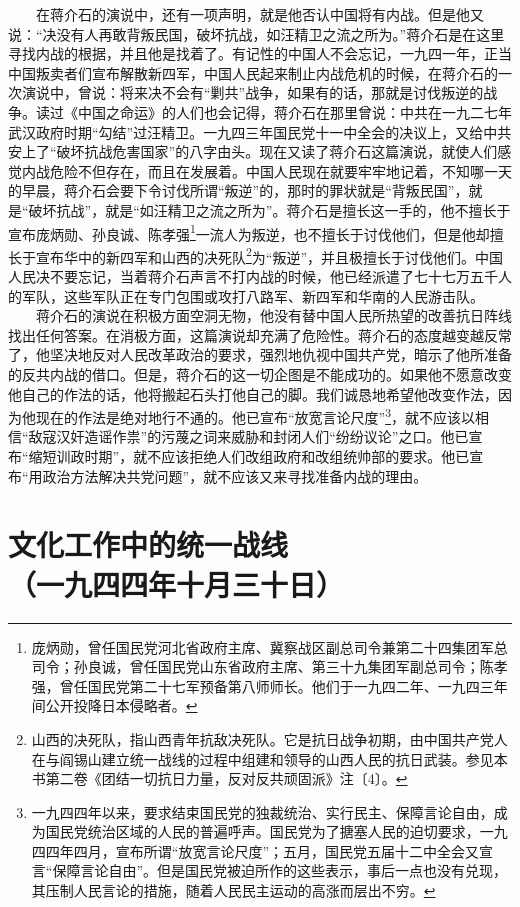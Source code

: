 \documentclass[cn,11pt,chinese]{elegantbook}
\def\myformat#1{\hfil\hfil #1}
\begin{document}
　　在蒋介石的演说中，还有一项声明，就是他否认中国将有内战。但是他又说：“决没有人再敢背叛民国，破坏抗战，如汪精卫之流之所为。”蒋介石是在这里寻找内战的根据，并且他是找着了。有记性的中国人不会忘记，一九四一年，正当中国叛卖者们宣布解散新四军，中国人民起来制止内战危机的时候，在蒋介石的一次演说中，曾说：将来决不会有“剿共”战争，如果有的话，那就是讨伐叛逆的战争。读过《中国之命运》的人们也会记得，蒋介石在那里曾说：中共在一九二七年武汉政府时期“勾结”过汪精卫。一九四三年国民党十一中全会的决议上，又给中共安上了“破坏抗战危害国家”的八字由头。现在又读了蒋介石这篇演说，就使人们感觉内战危险不但存在，而且在发展着。中国人民现在就要牢牢地记着，不知哪一天的早晨，蒋介石会要下令讨伐所谓“叛逆”的，那时的罪状就是“背叛民国”，就是“破坏抗战”，就是“如汪精卫之流之所为”。蒋介石是擅长这一手的，他不擅长于宣布庞炳勋、孙良诚、陈孝强\footnote[1]{ 庞炳勋，曾任国民党河北省政府主席、冀察战区副总司令兼第二十四集团军总司令；孙良诚，曾任国民党山东省政府主席、第三十九集团军副总司令；陈孝强，曾任国民党第二十七军预备第八师师长。他们于一九四二年、一九四三年间公开投降日本侵略者。}一流人为叛逆，也不擅长于讨伐他们，但是他却擅长于宣布华中的新四军和山西的决死队\footnote[2]{ 山西的决死队，指山西青年抗敌决死队。它是抗日战争初期，由中国共产党人在与阎锡山建立统一战线的过程中组建和领导的山西人民的抗日武装。参见本书第二卷《团结一切抗日力量，反对反共顽固派》注〔4〕。}为“叛逆”，并且极擅长于讨伐他们。中国人民决不要忘记，当着蒋介石声言不打内战的时候，他已经派遣了七十七万五千人的军队，这些军队正在专门包围或攻打八路军、新四军和华南的人民游击队。\\
　　蒋介石的演说在积极方面空洞无物，他没有替中国人民所热望的改善抗日阵线找出任何答案。在消极方面，这篇演说却充满了危险性。蒋介石的态度越变越反常了，他坚决地反对人民改革政治的要求，强烈地仇视中国共产党，暗示了他所准备的反共内战的借口。但是，蒋介石的这一切企图是不能成功的。如果他不愿意改变他自己的作法的话，他将搬起石头打他自己的脚。我们诚恳地希望他改变作法，因为他现在的作法是绝对地行不通的。他已宣布“放宽言论尺度”\footnote[3]{ 一九四四年以来，要求结束国民党的独裁统治、实行民主、保障言论自由，成为国民党统治区域的人民的普遍呼声。国民党为了搪塞人民的迫切要求，一九四四年四月，宣布所谓“放宽言论尺度”；五月，国民党五届十二中全会又宣言“保障言论自由”。但是国民党被迫所作的这些表示，事后一点也没有兑现，其压制人民言论的措施，随着人民民主运动的高涨而层出不穷。}，就不应该以相信“敌寇汉奸造谣作祟”的污蔑之词来威胁和封闭人们“纷纷议论”之口。他已宣布“缩短训政时期”，就不应该拒绝人们改组政府和改组统帅部的要求。他已宣布“用政治方法解决共党问题”，就不应该又来寻找准备内战的理由。\\
\newpage\section*{\myformat{文化工作中的统一战线}\\\myformat{（一九四四年十月三十日）}}
\end{document}
